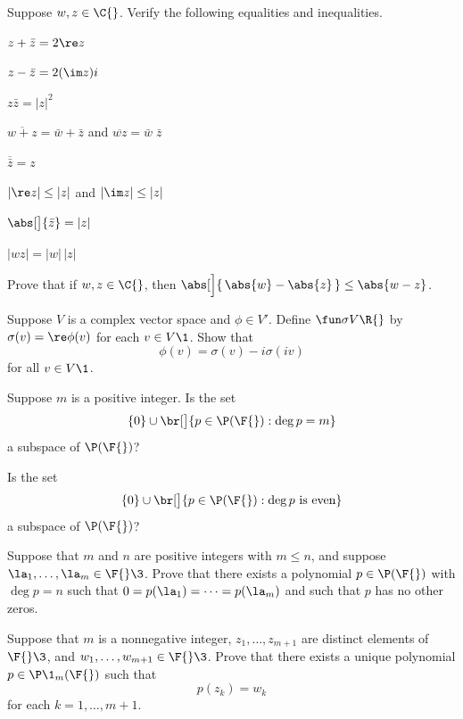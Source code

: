 
\exercise
Suppose $w, z \in \C{}$. Verify the following equalities and inequalities.
\begin{subtheorem} \addtolength{\itemsep}{3bp}
\item
$z + \bar{z} = 2 \re z$

\item
$z - \bar{z} = 2( \im z)i$

\item
$z \bar{z} = |z|^2$

\item
$\overline{w + z} = \bar{w} + \bar{z}$  and $\overline{wz} = \bar{w} \; \bar{z}$

\item
$\overline{\bar{z}} = z$

\item
$| \re z | \le |z|$ and $| \im z | \le |z|$

\item
$\abs[\big]{\bar{z}} = |z|$

\item
$|wz| = |w|\,|z|$
\end{subtheorem}


\exercise
Prove that if $w, z \in \C{}$, then $\abs[\Big]{\, \abs{w} - \abs{z} \,} \le \abs{w-z}$. \label{4reverse}


\exercise
Suppose $V$ is a complex vector space and $\phi \in V'\!$. Define $\fun \sigma V {\R{}}$ by
$\sigma(v) = \re \phi(v)$ for each $v \in V\1$. Show that
\[
\phi(v) = \sigma(v) - i \sigma(iv)
\]
for all $v \in V\1$.


\exercise
Suppose $m$ is a positive integer.  Is the set
\[
\{0\} \cup \br[\big]{p \in \P(\F{}): \deg p = m}
\]
a subspace of $\P(\F{})$?


\exercise
Is the set
\[
\{0\} \cup \br[\big]{p \in \P(\F{}): \deg p \text{ is even}}
\]
a subspace of $\P(\F{})$?


\exercise
Suppose that $m$ and $n$ are positive integers with $m \le n$, and suppose $\la_1, \dots, \la_m \in \F{}\3$. Prove that there exists a polynomial $p \in \P(\F{})$ with $\deg p = n$ such that $0 = p(\la_1) = \dots = p(\la_m)$ and such that $p$ has no other zeros.


\exercise
Suppose that $m$ is a nonnegative integer, $z_1, \dots, z_{m+1}$ are distinct elements of $\F{}\3$, and
$w_1, \dots, w_{m+1} \in \F{}\3$.  Prove that there exists a unique polynomial
$p \in \P\1_m(\F{})$ such that \label{PolyInterpolation}
\[
p(z_k) = w_k
\]
for each $k = 1, \dots, m + 1$.


